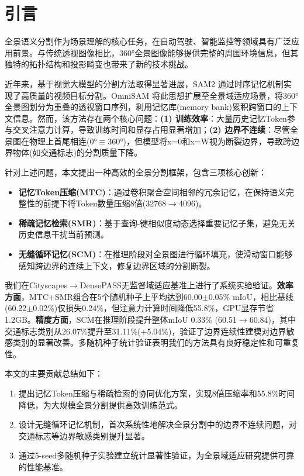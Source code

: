 \section{引言}

全景语义分割作为场景理解的核心任务，在自动驾驶、智能监控等领域具有广泛应用前景\cite{opencv_fisheye}。与传统透视图像相比，360°全景图像能够提供完整的周围环境信息，但其独特的拓扑结构和投影畸变也带来了新的技术挑战。

近年来，基于视觉大模型的分割方法取得显著进展，SAM2\cite{ravi2024sam2} 通过时序记忆机制实现了高质量的视频目标分割。OmniSAM\cite{omnisam2024} 将此思想扩展至全景域适应场景，将360°全景图划分为重叠的透视窗口序列，利用记忆库(memory bank)累积跨窗口的上下文信息。然而，该方法存在两个核心问题：\textbf{(1) 训练效率}：大量历史记忆Token参与交叉注意力计算，导致训练时间和显存占用显著增加；\textbf{(2) 边界不连续}：尽管全景图在物理上首尾相连(0°$\equiv$360°)，但模型将x=0和x=W视为断裂边界，导致跨边界物体(如交通标志)的分割质量下降。

针对上述问题，本文提出一种高效的全景分割框架，包含三项核心创新：

\begin{itemize}
\item \textbf{记忆Token压缩(MTC)}：通过卷积聚合空间相邻的冗余记忆，在保持语义完整性的前提下将Token数量压缩8倍(32768$\rightarrow$4096)。
\item \textbf{稀疏记忆检索(SMR)}：基于查询-键相似度动态选择重要记忆子集，避免无关历史信息干扰当前预测。
\item \textbf{无缝循环记忆(SCM)}：在推理阶段对全景图进行循环填充，使滑动窗口能够感知跨边界的连续上下文，修复边界区域的分割断裂。
\end{itemize}

我们在Cityscapes$\rightarrow$DensePASS无监督域适应基准上进行了系统实验验证。\textbf{效率方面}，MTC+SMR组合在5个随机种子上平均达到60.00$\pm$0.05\% mIoU，相比基线(60.22$\pm$0.02\%)仅损失0.24\%，但注意力计算时间降低55.8\%，GPU显存节省1.2GB。\textbf{精度方面}，SCM在推理阶段提升整体mIoU 0.33\% (60.51$\rightarrow$60.84)，其中交通标志类别从26.07\%提升至31.11\%(+5.04\%)，验证了边界连续性建模对边界敏感类别的显著改善。多随机种子统计验证表明我们的方法具有良好稳定性和可重复性。

本文的主要贡献总结如下：

\begin{enumerate}
\item 提出记忆Token压缩与稀疏检索的协同优化方案，实现8倍压缩率和55.8\%时间降低，为大规模全景分割提供高效训练范式。
\item 设计无缝循环记忆机制，首次系统性地解决全景分割中的边界不连续问题，对交通标志等边界敏感类别提升显著。
\item 通过5-seed多随机种子实验建立统计显著性验证，为全景域适应研究提供可靠的性能基准。
\end{enumerate}
